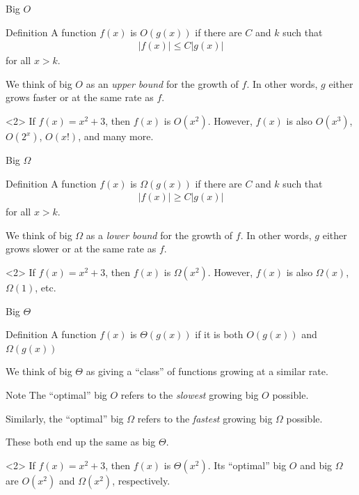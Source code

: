 \documentclass[dvipsnames,t]{beamer}
\begin{document}
\begin{frame}{Big $O$}
\begin{block}{Definition}
	A function $f(x)$ is $O(g(x))$ if there are $C$ and $k$ such that
	\begin{align*}
	|f(x)| \leq C|g(x)|
	\end{align*}
	for all $x>k$.
\end{block}
We think of big $O$ as an \textit{upper bound} for the growth of $f$. In other words, $g$ either grows faster or at the same rate as $f$.
\begin{example}<2>
If $f(x)=x^2+3$, then $f(x)$ is $O(x^2)$. However, $f(x)$ is also $O(x^3)$, $O(2^x)$, $O(x!)$, and many more.
\end{example}

\end{frame}

\begin{frame}{Big $\Omega$}
\begin{block}{Definition}
	A function $f(x)$ is $\Omega(g(x))$ if there are $C$ and $k$ such that
	\begin{align*}
	|f(x)| \geq C|g(x)|
	\end{align*}
	for all $x>k$.
\end{block}
We think of big $\Omega$ as a \textit{lower bound} for the growth of $f$. In other words, $g$ either grows slower or at the same rate as $f$.
\begin{example}<2>
If $f(x)=x^2+3$, then $f(x)$ is $\Omega(x^2)$. However, $f(x)$ is also $\Omega(x)$, $\Omega(1)$, etc.
\end{example}
\end{frame}

\begin{frame}{Big $\Theta$}
\begin{block}{Definition}
	A function $f(x)$ is $\Theta(g(x))$ if it is both $O(g(x))$ and $\Omega(g(x))$
\end{block}
We think of big $\Theta$ as giving a ``class'' of functions growing at a similar rate.
\begin{block}{Note}
The ``optimal'' big $O$ refers to the \textit{slowest} growing big $O$ possible. 

Similarly, the ``optimal'' big $\Omega$ refers to the \textit{fastest} growing big $\Omega$ possible. 

These both end up the same as big $\Theta$.
\end{block}
\begin{example}<2>
If $f(x)=x^2+3$, then $f(x)$ is $\Theta(x^2)$. Its ``optimal'' big $O$ and big $\Omega$ are $O(x^2)$ and $\Omega(x^2)$, respectively.
\end{example}
\end{frame}
\end{document}
